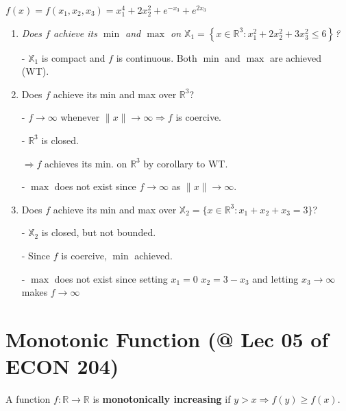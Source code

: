 \documentclass[11pt]{elegantbook}
\begin{document}
\begin{example}
    $f(x)=f\left(x_{1}, x_{2}, x_{3}\right)=x_{1}^{4}+2 x_{2}^{2}+e^{-x_{3}}+e^{2 x_{3}}$
\end{example}

\begin{enumerate}[1)]
    \item \textit{Does $f$ achieve its $\min$ and $\max$ on $\mathbb{X}_{1}=\left\{x \in \mathbb{R}^{3}: x_{1}^{2}+2 x_{2}^{2}+3 x_{3}^{2} \leqslant 6\right\}$?}
    
    - $\mathbb{X}_{1}$ is compact and $f$ is continuous. Both $\min$ and $\max$ are achieved (WT).
    \item Does $f$ achieve its min and max over $\mathbb{R}^{3}$?
    
    - $f \rightarrow \infty$ whenever $\|x\| \rightarrow \infty \Rightarrow f$ is coercive.

    - $\mathbb{R}^{3}$ is closed.

    $\Rightarrow f$ achieves its min. on $\mathbb{R}^{3}$ by corollary to WT.

    - $\max$ does not exist since $f \rightarrow \infty$ as $\|x\| \rightarrow \infty$.

    \item Does $f$ achieve its min and max over $\mathbb{X}_{2}=\{x \in \mathbb{R}^{3}: x_{1}+x_{2}+x_{3}=3\}$?
    
    - $\mathbb{X}_{2}$ is closed, but not bounded.

    - Since $f$ is coercive, $\min$ achieved.

    - $\max$ does not exist since setting $x_{1}=0$ $x_{2}=3-x_{3}$ and letting $x_{3} \rightarrow \infty$ makes $f \rightarrow \infty$
\end{enumerate}


\section{Monotonic Function \small{(@ Lec 05 of ECON 204)}}
\begin{definition}
    \normalfont
    A function $f : \mathbb{R} \rightarrow  \mathbb{R}$ is \textbf{monotonically increasing} if $y>x \Rightarrow f(y)\geq f(x)$.
\end{definition}
\end{document}
